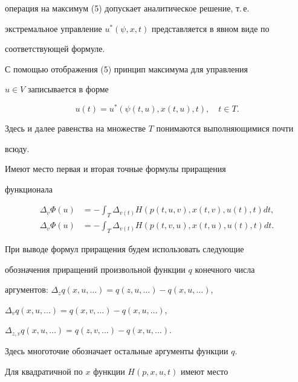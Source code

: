 операция на максимум (5) допускает аналитическое решение, т.\,е.


экстремальное управление $u^*(\psi,x,t)$ представляется в явном виде по 


соответствующей формуле.





С помощью отображения (5) принцип максимума для управления 


$u\in V$ записывается в форме


\begin{equation}


u(t)=u^*(\psi(t,u),x(t,u),t),\quad t\in T.


\end{equation}


Здесь и далее равенства на множестве $T$ понимаются выполняющимися почти


всюду.





Имеют место первая и вторая точные формулы приращения 


функционала


\begin{align}


\Delta_v\Phi(u)&=-\int_T \Delta_{v(t)}H(p(t,u,v),x(t,v),


u(t),t)dt, \\


\Delta_v\Phi(u)&=-\int_T \Delta_{v(t)}H(p(t,v,u),x(t,u),


u(t),t)dt.


\end{align}





При выводе формул приращения будем использовать следующие 


обозначения приращений произвольной функции $q$ конечного числа 


аргументов: $\Delta_z q(x,u,\dotsc)=q(z,u,\dotsc)-q(x,u,\dotsc)$,


$\Delta_v q(x,u,\dotsc)=q(x,v,\dotsc)-q(x,u,\dotsc)$,


$\Delta_{z,v}q(x,u,\dotsc)=q(z,v,\dotsc)-q(x,u,\dotsc)$.


Здесь многоточие обозначает остальные аргументы функции $q$.





Для квадратичной по $x$ функции $H(p,x,u,t)$ имеют место 


